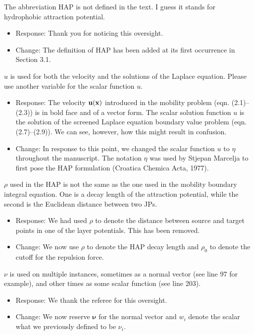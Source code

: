 \documentclass[11pt]{article}
\newcommand{\comment}[1]{{\color{blue} #1}}
\begin{document}
\noindent
\comment{The abbreviation HAP is not defined in the text. I guess it stands for hydrophobic attraction potential.
}
\begin{itemize}
  \item Response: Thank you for noticing this oversight. 
  \item Change: The definition of HAP has been added at its first occurrence in Section 3.1. 
\end{itemize}

\noindent
\comment{$u$ is used for both the velocity and the solutions of the
Laplace equation. Please use another variable for the scalar function
$u$.}
\begin{itemize}
\item Response: The velocity ${\bf u}({\bf x})$ introduced in the mobility problem (eqn. (2.1)--(2.3)) is in bold face and of a vector form. The scalar solution function $u$ is the solution of the screened Laplace equation boundary value problem (eqn. (2.7)--(2.9)).
  We can see, however, how this might result in confusion. 
\item Change: In response to this point, we changed the scalar function $u$ to $\eta$ throughout the manuscript.
  The notation $\eta$ was used by Stjepan Marcelja to first pose the HAP formulation
  (Croatica Chemica Acta, 1977).
\end{itemize}

\noindent
\comment{$\rho$ used in the HAP is not the same as the one used in the
mobility boundary integral equation. One is a decay length of the
attraction potential, while the second is the Euclidean distance between
two JPs.}
\begin{itemize}
  \item Response: We had used $\rho$ to denote the distance between source and
    target points in one of the layer potentials. This has been removed.

  \item Change: We now use $\rho$ to denote the HAP decay length and $\rho_0$ to
    denote the cutoff for the repulsion force.
\end{itemize}

\noindent
\comment{$\nu$ is used on multiple instances, sometimes as a normal
vector (see line 97 for example), and other times as some scalar
function (see line 203).}
\begin{itemize}
  \item Response: We thank the referee for this oversight.
  \item Change: We now reserve $\boldsymbol{\nu}$ for the normal vector and
    $w_i$ denote the scalar what we previously defined to be $\nu_i$.
\end{itemize}
\end{document}
